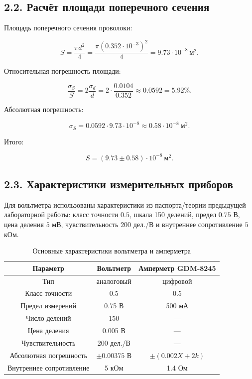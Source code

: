 \documentclass[12pt,a4paper]{article}
\begin{document}
\subsection*{2.2. Расчёт площади поперечного сечения}

Площадь поперечного сечения проволоки:

\begin{equation}
S=
\frac{\pi d^2}{4}
=
\frac{\pi(0.352\cdot10^{-3})^2}{4}
=
9.73\cdot10^{-8}\ \text{м}^2.
\end{equation}

Относительная погрешность площади:

\begin{equation}
\frac{\sigma_S}{S}
=
2\frac{\sigma_d}{d}
=
2\cdot\frac{0.0104}{0.352}
\approx
0.0592
=
5.92\%.
\end{equation}

Абсолютная погрешность:

\begin{equation}
\sigma_S=
0.0592\cdot9.73\cdot10^{-8}
\approx
0.58\cdot10^{-8}\ \text{м}^2.
\end{equation}

Итого:

\begin{equation}
\boxed{
S=(9.73\pm0.58)\cdot10^{-8}\ \text{м}^2
}.
\end{equation}


\subsection*{2.3. Характеристики измерительных приборов}

Для вольтметра использованы характеристики из паспорта/теории
предыдущей лабораторной работы: класс точности $0.5$, шкала 150 делений,
предел $0.75$ В, цена деления $5$ мВ, чувствительность $200$ дел./В
и внутреннее сопротивление $5$ кОм.


\begin{table}[H]
\centering
\caption{Основные характеристики вольтметра и амперметра}
\label{tab:instruments}
\begin{tabular}{c|c|c}
\toprule
Параметр & Вольтметр & Амперметр GDM-8245\\
\midrule
Тип & аналоговый & цифровой\\
Класс точности & 0.5 & 0.5\\
Предел измерений & 0.75 В & 500 мА\\
Число делений & 150 & ---\\
Цена деления & 0.005 В & ---\\
Чувствительность & 200 дел./В & ---\\
Абсолютная погрешность &
$\pm0.00375$ В &
$\pm(0.002X+2k)$\\
Внутреннее сопротивление & 5 кОм & 1.4 Ом\\
\bottomrule
\end{tabular}
\end{table}
\end{document}
